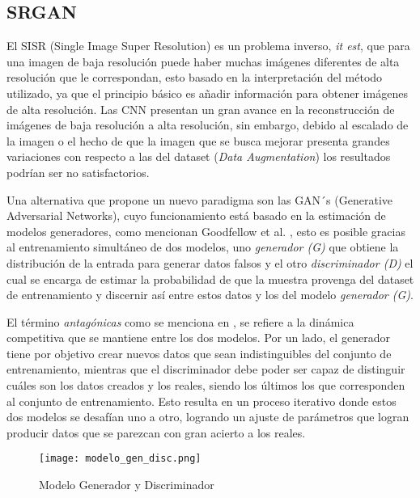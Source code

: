 \subsection{SRGAN}

El SISR (Single Image Super Resolution) es un problema inverso, \emph{it est}, que para una imagen de baja resolución puede haber muchas
imágenes diferentes de alta resolución que le correspondan, esto basado en la interpretación del método utilizado, ya que
el principio básico es añadir información para obtener imágenes de alta resolución.
Las CNN presentan un gran avance en la reconstrucción de imágenes de baja resolución a alta resolución,
sin embargo, debido al escalado de la imagen o el hecho de que la imagen que se busca mejorar presenta grandes
variaciones con respecto a las del dataset (\emph{Data Augmentation}) los resultados podrían ser no satisfactorios.


Una alternativa que propone un nuevo paradigma son las GAN´s (Generative Adversarial Networks), cuyo funcionamiento está basado
en la estimación de modelos generadores, como mencionan Goodfellow et al. \cite{GANs}, esto es 
posible gracias al entrenamiento simultáneo de dos modelos, uno \emph{generador (G)} que obtiene 
la distribución de la entrada para generar datos falsos y el otro \emph{discriminador (D)} el cual se encarga de estimar 
la probabilidad de que la muestra provenga del dataset de entrenamiento y discernir así entre estos datos y 
los del modelo \emph{ generador (G)}.

El término \emph{antagónicas} como se menciona en \cite{SRGAN_Tesis}, se refiere a la dinámica 
competitiva que se mantiene entre los dos modelos. Por un lado,
el generador tiene por objetivo crear nuevos datos que sean indistinguibles del
conjunto de entrenamiento, mientras que el discriminador debe poder ser capaz
de distinguir cuáles son los datos creados y los reales, siendo los últimos los que corresponden
 al conjunto de entrenamiento. Esto resulta en un proceso iterativo donde estos dos modelos
 se desafían uno a otro, logrando un ajuste de parámetros
 que logran producir datos que se parezcan con gran acierto a los reales.
 

\begin{figure}[H]
    \begin{center}
      \texttt{[image: modelo\_gen\_disc.png]}
      \caption{Modelo Generador y Discriminador}
      \label{Alexis1}
    \end{center}
\end{figure}


